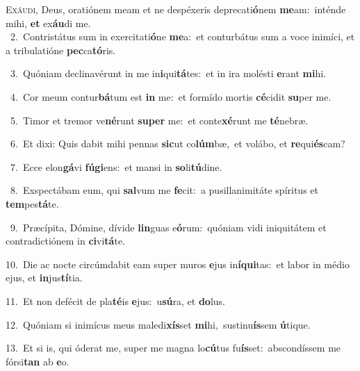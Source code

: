 \lettrine{\initial\textcolor{\initialcolor}{E}}{xáudi,} Deus, oratiónem meam et ne despéxeris deprecati\-\textbf{ó}\-nem \textbf{me}\-am:~\star inténde mihi, \textbf{et} ex\-\textbf{áu}\-di me.\\
{\numbfont\textcolor{\numbcolor}{~2.}}~Contristátus sum in exercitati\-\textbf{ó}\-ne \textbf{me}\-a:~\star et conturbátus sum a voce inimíci, et a tribulatióne \textbf{pec}\-ca\-\textbf{tó}\-ris.\par
{\numbfont\textcolor{\numbcolor}{~3.}}~Quóniam declinavérunt in me in\-\textbf{i}\-qui\-\textbf{tá}\-tes:~\star et in ira molésti \textbf{e}\-rant \textbf{mi}\-hi.\par
{\numbfont\textcolor{\numbcolor}{~4.}}~Cor meum contur\-\textbf{bá}\-tum est \textbf{in} me:~\star et formído mortis \textbf{cé}\-cidit \textbf{su}\-per me.\par
{\numbfont\textcolor{\numbcolor}{~5.}}~Timor et tremor ve\-\textbf{né}\-runt \textbf{su}\-\textbf{per} me:~\star et conte\-\textbf{xé}\-runt me \textbf{té}\-nebræ.\par
{\numbfont\textcolor{\numbcolor}{~6.}}~Et dixi: Quis dabit mihi pennas \textbf{sic}\-ut co\-\textbf{lúm}\-bæ,~\star et volábo, et \textbf{re}\-qui\-\textbf{és}\-cam?\par
{\numbfont\textcolor{\numbcolor}{~7.}}~Ecce elon\-\textbf{gá}\-vi \textbf{fú}\-\textbf{gi}ens:~\star et mansi in \textbf{so}\-li\-\textbf{tú}\-dine.\par
{\numbfont\textcolor{\numbcolor}{~8.}}~Exspectábam eum, qui \textbf{sal}\-vum me \textbf{fe}\-cit:~\star a pusillanimitáte spíritus et \textbf{tem}\-pes\-\textbf{tá}\-te.\par
{\numbfont\textcolor{\numbcolor}{~9.}}~Præcípita, Dómine, dívide \textbf{lin}\-guas e\-\textbf{ó}\-rum:~\star quóniam vidi iniquitátem et contradictiónem in \textbf{ci}\-vi\-\textbf{tá}\-te.\par
{\numbfont\textcolor{\numbcolor}{10.}}~Die ac nocte circúmdabit eam super muros \textbf{e}\-jus in\-\textbf{í}\-\textbf{qui}tas:~\star et labor in médio ejus, et \textbf{in}\-jus\-\textbf{tí}\-tia.\par
{\numbfont\textcolor{\numbcolor}{11.}}~Et non defécit de pla\-\textbf{té}\-is \textbf{e}\-jus:~\star u\-\textbf{sú}\-ra, et \textbf{do}\-lus.\par
{\numbfont\textcolor{\numbcolor}{12.}}~Quóniam si inimícus meus maledi\-\textbf{xís}\-set \textbf{mi}\-hi,~\star sustinu\-\textbf{ís}\-sem \textbf{ú}\-tique.\par
{\numbfont\textcolor{\numbcolor}{13.}}~Et si is, qui óderat me, super me magna lo\-\textbf{cú}\-tus fu\-\textbf{ís}\-set:~\star abscondíssem me fórsi\textbf{tan} ab \textbf{e}\-o.\par
